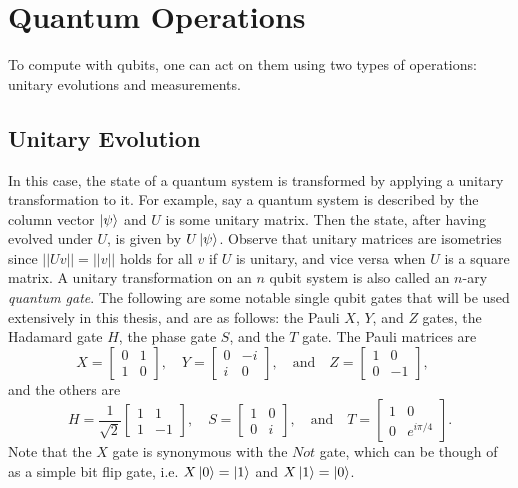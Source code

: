 \documentclass[12pt]{dalthesis}
\begin{document}
\section{Quantum Operations}
To compute with qubits, one can act on them using two types of operations: unitary evolutions and measurements.
\subsection{Unitary Evolution}
In this case, the state of a quantum system is transformed by applying a unitary transformation to it. For example, say a quantum system is described by the column vector $\ket{\psi}$ and $U$ is some unitary matrix. Then the state, after having evolved under $U$, is given by $U \ket{\psi}$. Observe that unitary matrices are isometries since $||Uv|| = ||v||$ holds for all $v$ if $U$ is unitary, and vice versa when $U$ is a square matrix. A unitary transformation on an $n$ qubit system is also called an $n$-ary \emph{quantum gate}. The following are some notable single qubit gates that will be used extensively in this thesis, and are as follows: the Pauli $X$, $Y$, and $Z$ gates, the Hadamard gate $H$, the phase gate $S$, and the $T$ gate. The Pauli matrices are 
\begin{equation*}
  X = \begin{bmatrix}
    0 & 1 \\
    1 & 0
  \end{bmatrix}, \quad
  Y = \begin{bmatrix}
  0 & -i \\
  i & 0
  \end{bmatrix}, \quad \mbox{and} \quad
  Z = \begin{bmatrix}
  1 & 0 \\
  0 & -1
  \end{bmatrix}, \quad
\end{equation*}
and the others are
\begin{equation*}
  H = \frac{1}{\sqrt{2}} \begin{bmatrix}
  1 & 1 \\
  1 & -1
  \end{bmatrix}, \quad
  S = \begin{bmatrix}
  1 & 0 \\
  0 & i
  \end{bmatrix}, \quad \mbox{and} \quad
  T = \begin{bmatrix}
  1 & 0 \\
  0 & e^{i \pi /4}
  \end{bmatrix}.
\end{equation*}
Note that the $X$ gate is synonymous with the $Not$ gate, which can be though of as a simple bit flip gate, i.e. $X\ket{0} = \ket{1}$ and $X\ket{1} = \ket{0}$.
\end{document}
